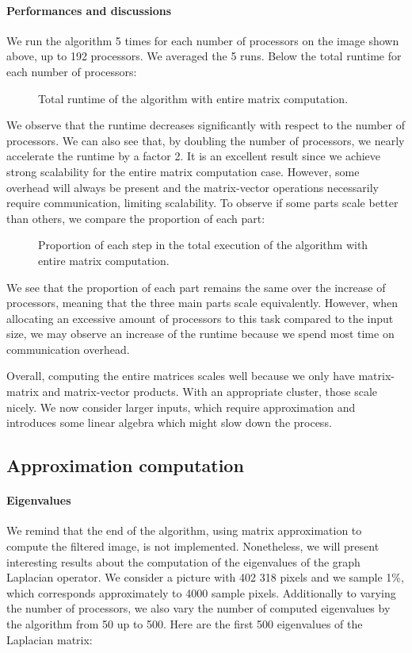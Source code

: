 \paragraph{Performances and discussions}
We run the algorithm 5 times for each number of processors on the image shown above, up to 192 processors.
We averaged the 5 runs.
Below the total runtime for each number of processors:
\begin{figure}[H]
  \centering
  
  \caption{Total runtime of the algorithm with entire matrix computation.}
\end{figure}

We observe that the runtime decreases significantly with respect to the number of processors.
We can also see that, by doubling the number of processors, we nearly accelerate the runtime by a factor 2.
It is an excellent result since we achieve strong scalability for the entire matrix computation case.
However, some overhead will always be present and the matrix-vector operations necessarily require communication, limiting scalability.
To observe if some parts scale better than others, we compare the proportion of each part:
\begin{figure}[H]
  \centering
  
  \caption{Proportion of each step in the total execution of the algorithm with entire matrix computation.}
\end{figure}

We see that the proportion of each part remains the same over the increase of processors, meaning that the three main parts scale equivalently.
However, when allocating an excessive amount of processors to this task compared to the input size, we may observe an increase of the runtime because we spend most time on communication overhead.

Overall, computing the entire matrices scales well because we only have matrix-matrix and matrix-vector products.
With an appropriate cluster, those scale nicely.
We now consider larger inputs, which require approximation and introduces some linear algebra which might slow down the process.

\subsection{Approximation computation}

\paragraph{Eigenvalues}
We remind that the end of the algorithm, using matrix approximation to compute the filtered image, is not implemented.
Nonetheless, we will present interesting results about the computation of the eigenvalues of the graph Laplacian operator.
We consider a picture with 402 318 pixels and we sample 1\%, which corresponds approximately to 4000 sample pixels.
Additionally to varying the number of processors, we also vary the number of computed eigenvalues by the algorithm from 50 up to 500.
Here are the first 500 eigenvalues of the Laplacian matrix:

